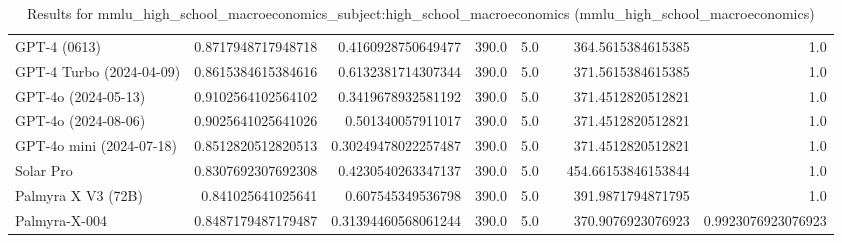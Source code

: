 \begin{table}[htp]
{\begin{tabular}{lrrrrrrr}
GPT-4 (0613) & 0.8717948717948718 & 0.4160928750649477 & 390.0 & 5.0 &  & 364.5615384615385 & 1.0 \\
GPT-4 Turbo (2024-04-09) & 0.8615384615384616 & 0.6132381714307344 & 390.0 & 5.0 &  & 371.5615384615385 & 1.0 \\
GPT-4o (2024-05-13) & 0.9102564102564102 & 0.3419678932581192 & 390.0 & 5.0 &  & 371.4512820512821 & 1.0 \\
GPT-4o (2024-08-06) & 0.9025641025641026 & 0.501340057911017 & 390.0 & 5.0 &  & 371.4512820512821 & 1.0 \\
GPT-4o mini (2024-07-18) & 0.8512820512820513 & 0.30249478022257487 & 390.0 & 5.0 &  & 371.4512820512821 & 1.0 \\
Solar Pro & 0.8307692307692308 & 0.4230540263347137 & 390.0 & 5.0 &  & 454.66153846153844 & 1.0 \\
Palmyra X V3 (72B) & 0.841025641025641 & 0.607545349536798 & 390.0 & 5.0 &  & 391.9871794871795 & 1.0 \\
Palmyra-X-004 & 0.8487179487179487 & 0.31394460568061244 & 390.0 & 5.0 &  & 370.9076923076923 & 0.9923076923076923 \\
\bottomrule
\end{tabular}}
\caption{Results for mmlu_high_school_macroeconomics_subject:high_school_macroeconomics (mmlu_high_school_macroeconomics)}
\label{fig:mmlu_high_school_macroeconomics_subject:high_school_macroeconomics (mmlu_high_school_macroeconomics)}
\end{table}